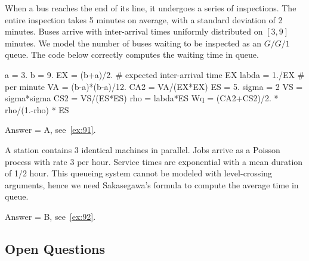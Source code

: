 \begin{exercise}[201907] 
When a bus reaches the end of its line, it undergoes a series of inspections.
 The entire inspection takes 5 minutes on average, with a standard deviation of 2 minutes.
 Buses arrive with inter-arrival times uniformly distributed on $[3,9]$ minutes.
 We model the number of buses waiting to be inspected as an $G/G/1$ queue.
 The code below correctly computes the waiting time in queue.
\begin{pyconsole}
a = 3.
b = 9. 
EX = (b+a)/2. # expected inter-arrival time
EX
labda = 1./EX # per minute
VA = (b-a)*(b-a)/12.
CA2 = VA/(EX*EX)
ES = 5.
sigma = 2
VS = sigma*sigma
CS2 = VS/(ES*ES)
rho = labda*ES
Wq = (CA2+CS2)/2. * rho/(1.-rho) * ES
\end{pyconsole}

\begin{solution}
Answer = A, see~\cref{ex:91}.
\end{solution}
\end{exercise}

\begin{exercise}[201907]
A station contains 3 identical machines in parallel. Jobs arrive as a Poisson process with rate $3$ per hour. Service times are exponential with a mean duration of 1/2 hour. 
This queueing system cannot be modeled with level-crossing arguments, hence we need Sakasegawa's formula to compute the average time in queue. 
\begin{solution}
Answer = B, see~\cref{ex:92}.
\end{solution}
\end{exercise}


\subsection{Open Questions}



